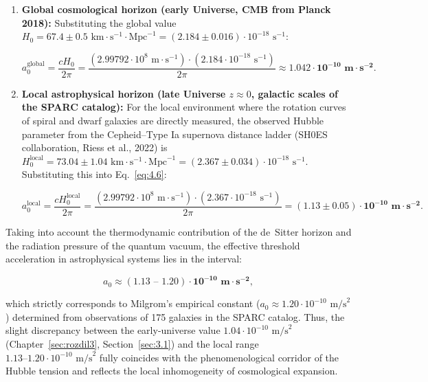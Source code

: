 \documentclass[11pt,a4paper]{article}
\theoremstyle{definition}
\begin{document}
\begin{enumerate}
\item \textbf{Global cosmological horizon (early Universe, CMB from Planck 2018):}  
Substituting the global value $H_0 = 67.4 \pm 0.5\text{ km}\cdot\text{s}^{-1}\cdot\text{Mpc}^{-1} = (2.184 \pm 0.016) \cdot 10^{-18}\text{ s}^{-1}$:

\begin{equation}\label{eq:4.7}\tag{4.7}
a_0^{\text{global}} = \frac{c H_0}{2\pi} = \frac{(2.99792 \cdot 10^8\text{ m}\cdot\text{s}^{-1}) \cdot (2.184 \cdot 10^{-18}\text{ s}^{-1})}{2\pi} \approx \mathbf{1.042 \cdot 10^{-10}\text{ m}\cdot\text{s}^{-2}}.
\end{equation}

\item \textbf{Local astrophysical horizon (late Universe $z \approx 0$, galactic scales of the SPARC catalog):}  
For the local environment where the rotation curves of spiral and dwarf galaxies are directly measured, the observed Hubble parameter from the Cepheid--Type Ia supernova distance ladder (SH0ES collaboration, Riess et al., 2022) is $H_0^{\text{local}} = 73.04 \pm 1.04\text{ km}\cdot\text{s}^{-1}\cdot\text{Mpc}^{-1} = (2.367 \pm 0.034) \cdot 10^{-18}\text{ s}^{-1}$. Substituting this into Eq.~\eqref{eq:4.6}:

\begin{equation}\label{eq:4.8}\tag{4.8}
a_0^{\text{local}} = \frac{c H_0^{\text{local}}}{2\pi} = \frac{(2.99792 \cdot 10^8\text{ m}\cdot\text{s}^{-1}) \cdot (2.367 \cdot 10^{-18}\text{ s}^{-1})}{2\pi} = \mathbf{(1.13 \pm 0.05) \cdot 10^{-10}\text{ m}\cdot\text{s}^{-2}}.
\end{equation}
\end{enumerate}

Taking into account the thermodynamic contribution of the de~Sitter horizon and the radiation pressure of the quantum vacuum, the effective threshold acceleration in astrophysical systems lies in the interval:

\begin{equation}\label{eq:4.9}\tag{4.9}
a_0 \approx \mathbf{(1.13 \text{ -- } 1.20) \cdot 10^{-10}\text{ m}\cdot\text{s}^{-2}},
\end{equation}

which strictly corresponds to Milgrom's empirical constant ($a_0 \approx 1.20 \cdot 10^{-10}\text{ m/s}^2$) determined from observations of 175 galaxies in the SPARC catalog. Thus, the slight discrepancy between the early-universe value $1.04 \cdot 10^{-10}\text{ m/s}^2$ (Chapter~\ref{sec:rozdil3}, Section~\ref{sec:3.1}) and the local range $1.13\text{--}1.20 \cdot 10^{-10}\text{ m/s}^2$ fully coincides with the phenomenological corridor of the Hubble tension and reflects the local inhomogeneity of cosmological expansion.
\end{document}
